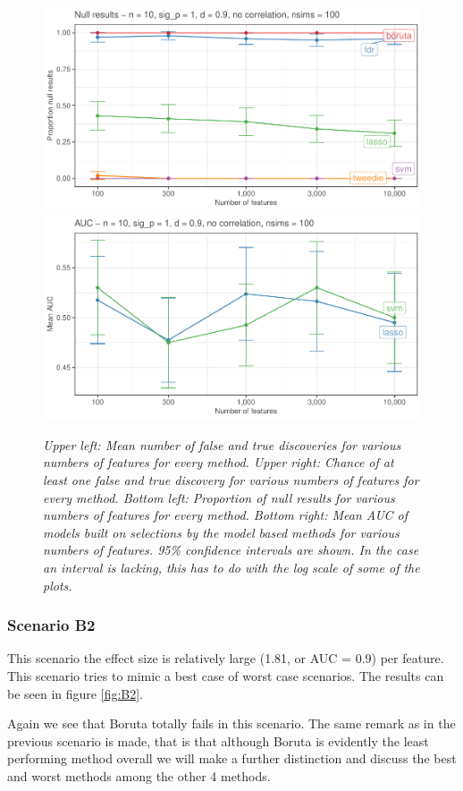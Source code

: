 \documentclass[
]{article}
\begin{document}
\begin{figure}

{\centering \includegraphics[width=0.49\linewidth]{main_files/figure-latex/B1-1} \includegraphics[width=0.49\linewidth]{main_files/figure-latex/B1-2} 

}

\caption{\textit{Upper left: Mean number of false and true discoveries for various numbers of features for every method. Upper right: Chance of at least one false and true discovery for various numbers of features for every method. Bottom left: Proportion of null results for various numbers of features for every method. Bottom right: Mean AUC of models built on selections by the model based methods for various numbers of features. 95\% confidence intervals are shown. In the case an interval is lacking, this has to do with the log scale of some of the plots.}}\label{fig:B1}
\end{figure}

\hypertarget{scenario-b2}{%
\subsubsection{Scenario B2}\label{scenario-b2}}

This scenario the effect size is relatively large (1.81, or AUC = 0.9) per feature. This scenario tries to mimic a best case of worst case scenarios. The results can be seen in figure \ref{fig:B2}.

Again we see that Boruta totally fails in this scenario. The same remark as in the previous scenario is made, that is that although Boruta is evidently the least performing method overall we will make a further distinction and discuss the best and worst methods among the other 4 methods.
\end{document}
